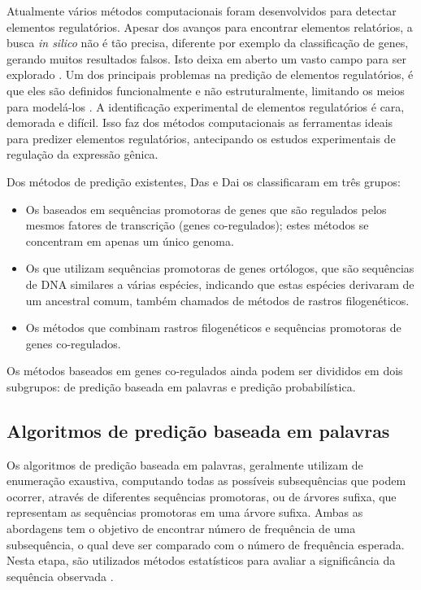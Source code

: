 Atualmente vários métodos computacionais foram desenvolvidos para detectar elementos regulatórios. Apesar dos avanços para encontrar elementos relatórios, a busca \textit{in silico} não é tão precisa, diferente por exemplo da classificação de genes, gerando muitos resultados falsos. Isto deixa em aberto um vasto campo para ser explorado \cite{Rombauts2003}. Um dos principais problemas na predição de elementos regulatórios, é que eles são definidos funcionalmente e não estruturalmente, limitando os meios para modelá-los \cite{Rombauts2003}. A identificação experimental de elementos regulatórios é  cara, demorada e difícil. Isso faz dos métodos computacionais as ferramentas ideais para predizer elementos regulatórios, antecipando os estudos experimentais de regulação da expressão gênica.


Dos métodos de predição existentes, Das e Dai \cite{Das2007} os classificaram em três grupos:
\begin{itemize}
\item Os baseados em sequências promotoras de genes que são regulados pelos mesmos fatores de transcrição (genes co-regulados); estes métodos se concentram em apenas um único genoma.

\item Os que utilizam sequências promotoras de genes ortólogos, que são sequências de DNA similares a várias espécies, indicando que estas espécies derivaram de um ancestral comum, também chamados de métodos de rastros filogenéticos.

\item Os métodos que combinam rastros filogenéticos e sequências promotoras de genes co-regulados.
\end{itemize}


Os métodos baseados em genes co-regulados ainda podem ser divididos em dois subgrupos: de predição baseada em palavras e predição probabilística.


\subsection{Algoritmos de predição baseada em palavras}

Os algoritmos de predição baseada em palavras, geralmente utilizam de enumeração exaustiva, computando todas as possíveis subsequências que podem ocorrer, através de diferentes sequências promotoras, ou de árvores sufixa, que representam as sequências promotoras em uma árvore sufixa. Ambas as abordagens tem o objetivo de encontrar número de frequência de uma subsequência, o qual deve ser comparado com o número de frequência esperada. Nesta etapa, são utilizados métodos estatísticos para avaliar a significância da sequência observada \cite{Rombauts2003}.

